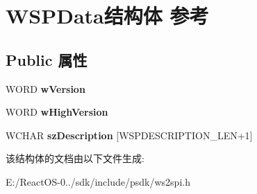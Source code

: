 \hypertarget{struct_w_s_p_data}{}\section{W\+S\+P\+Data结构体 参考}
\label{struct_w_s_p_data}
\subsection*{Public 属性}
\begin{DoxyCompactItemize}
\item 
\mbox{\label{struct_w_s_p_data_aafb22d22d1257ee2bf2c35b38d05d4f1}} 
W\+O\+RD {\bfseries w\+Version}
\item 
\mbox{\label{struct_w_s_p_data_a2e5acde2cbc7df606a89aa5fb2855876}} 
W\+O\+RD {\bfseries w\+High\+Version}
\item 
\mbox{\label{struct_w_s_p_data_a2f604c30e692677e03d52366d1712d44}} 
W\+C\+H\+AR {\bfseries sz\+Description} \mbox{[}W\+S\+P\+D\+E\+S\+C\+R\+I\+P\+T\+I\+O\+N\+\_\+\+L\+EN+1\mbox{]}
\end{DoxyCompactItemize}


该结构体的文档由以下文件生成\+:\begin{DoxyCompactItemize}
\item 
E\+:/\+React\+O\+S-\/0../sdk/include/psdk/ws2spi.\+h\end{DoxyCompactItemize}
